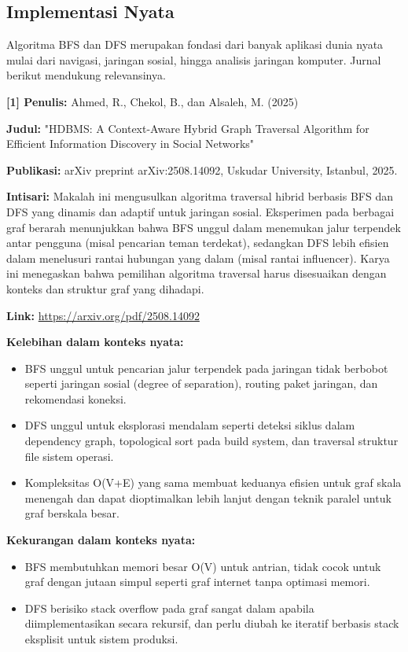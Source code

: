 \subsection{Implementasi Nyata}
Algoritma BFS dan DFS merupakan fondasi dari banyak aplikasi dunia nyata mulai dari navigasi, jaringan sosial, hingga analisis jaringan komputer. Jurnal berikut mendukung relevansinya.

\vspace{1em}
\textbf{[1] Penulis:} Ahmed, R., Chekol, B., dan Alsaleh, M. (2025)

\textbf{Judul:} "HDBMS: A Context-Aware Hybrid Graph Traversal Algorithm for Efficient Information Discovery in Social Networks"

\textbf{Publikasi:} arXiv preprint arXiv:2508.14092, Uskudar University, Istanbul, 2025.

\textbf{Intisari:} Makalah ini mengusulkan algoritma traversal hibrid berbasis BFS dan DFS yang dinamis dan adaptif untuk jaringan sosial. Eksperimen pada berbagai graf berarah menunjukkan bahwa BFS unggul dalam menemukan jalur terpendek antar pengguna (misal pencarian teman terdekat), sedangkan DFS lebih efisien dalam menelusuri rantai hubungan yang dalam (misal rantai influencer). Karya ini menegaskan bahwa pemilihan algoritma traversal harus disesuaikan dengan konteks dan struktur graf yang dihadapi.

\textbf{Link:} \url{https://arxiv.org/pdf/2508.14092}

\vspace{1em}
\textbf{Kelebihan dalam konteks nyata:}
\begin{itemize}
    \item BFS unggul untuk pencarian jalur terpendek pada jaringan tidak berbobot seperti jaringan sosial (degree of separation), routing paket jaringan, dan rekomendasi koneksi.
    \item DFS unggul untuk eksplorasi mendalam seperti deteksi siklus dalam dependency graph, topological sort pada build system, dan traversal struktur file sistem operasi.
    \item Kompleksitas O(V+E) yang sama membuat keduanya efisien untuk graf skala menengah dan dapat dioptimalkan lebih lanjut dengan teknik paralel untuk graf berskala besar.
\end{itemize}

\textbf{Kekurangan dalam konteks nyata:}
\begin{itemize}
    \item BFS membutuhkan memori besar O(V) untuk antrian, tidak cocok untuk graf dengan jutaan simpul seperti graf internet tanpa optimasi memori.
    \item DFS berisiko stack overflow pada graf sangat dalam apabila diimplementasikan secara rekursif, dan perlu diubah ke iteratif berbasis stack eksplisit untuk sistem produksi.
\end{itemize}